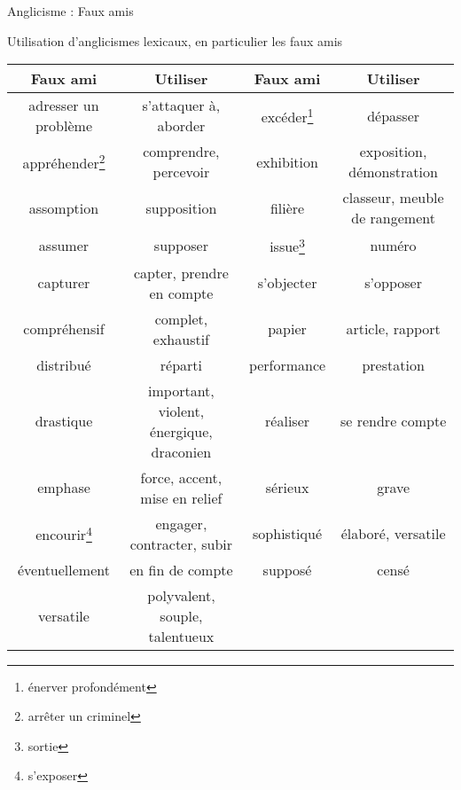 \documentclass[french]{beamer}
\begin{document}
\begin{frame}{Anglicisme : Faux amis}

Utilisation d'anglicismes lexicaux, en particulier les faux amis
\begin{center}\tiny
	\begin{tabular}{cccc}
		\hline
		Faux ami & Utiliser & Faux ami & Utiliser \\
		\hline
		adresser un problème & s'attaquer à, aborder & excéder\footnote{énerver profondément} & dépasser\\ 
		appréhender\footnote{arrêter un criminel} & comprendre, percevoir & exhibition & exposition, démonstration\\ 
		assomption & supposition & filière & classeur, meuble de rangement \\ 
		assumer & supposer & issue\footnote{sortie} & numéro \\ 
		capturer & capter, prendre en compte & s'objecter & s'opposer \\ 
		compréhensif & complet, exhaustif & papier & article, rapport \\ 
		distribué & réparti & performance & prestation \\ 
		drastique & important, violent, énergique, draconien & réaliser & se rendre compte \\ 
		emphase & force, accent, mise en relief & sérieux & grave \\ 
		encourir\footnote{s'exposer} & engager, contracter, subir & sophistiqué & élaboré, versatile \\ 
		éventuellement & en fin de compte & supposé & censé \\ 
		versatile & polyvalent, souple, talentueux &  &  \\ 
		\hline
	\end{tabular} 
\end{center}
\end{frame}
\end{document}
